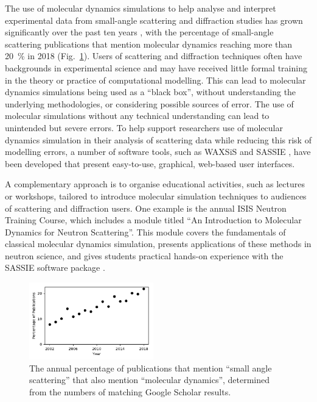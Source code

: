 \documentclass[amsmath,amssymb,twocolumn,superscriptaddress]{revtex4-1}
\begin{document}
\noindent The use of molecular dynamics simulations to help analyse and interpret experimental data from small-angle scattering and diffraction studies has grown significantly over the past ten years \cite{pan_molecular_2012,boldon_review_2015,hub_interpreting_2018,ivanovic_temperature-dependent_2018,east_structural_2016,wall_conformational_2014,wall_internal_2018,satoh_multiple_2015}, with the percentage of small-angle scattering publications that mention molecular dynamics reaching more than \SI{20}{\percent} in 2018 (Fig.~\ref{fig:growth}).
Users of scattering and diffraction techniques often have backgrounds in experimental science and may have received little formal training in the theory or practice of computational modelling.
This can lead to molecular dynamics simulations being used as a ``black box'', without understanding the underlying methodologies, or considering possible sources of error.
The use of molecular simulations without any technical understanding can lead to unintended but severe errors.
To help support researchers use of molecular dynamics simulation in their analysis of scattering data while reducing this risk of modelling errors, a number of software tools, such as WAXSiS and SASSIE \cite{chen_validating_2014,knight_waxsis_2015,perkins_atomistic_2016}, have been developed that present easy-to-use, graphical, web-based user interfaces.

A complementary approach is to organise educational activities, such as lectures or workshops, tailored to introduce molecular simulation techniques to audiences of scattering and diffraction users.
One example is the annual ISIS Neutron Training Course, which includes a module titled ``An Introduction to Molecular Dynamics for Neutron Scattering''.
This module covers the fundamentals of classical molecular dynamics simulation, presents applications of these methods in neutron science, and gives students practical hands-on experience with the SASSIE software package \cite{perkins_atomistic_2016}.

%
\begin{figure}
\label{fig:growth}
\includegraphics[width=0.48\textwidth]{figures/chem_data_py.pdf}
\caption{The annual percentage of publications that mention ``small angle scattering'' that also mention ``molecular dynamics'', determined from the numbers of matching Google Scholar results.}
\end{figure}
%
\end{document}
